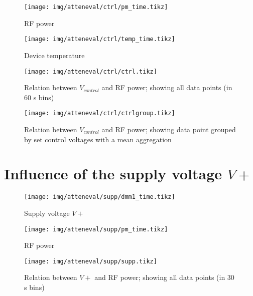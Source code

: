\begin{figure}[H]
	\centering
	\texttt{[image: img/atteneval/ctrl/pm\_time.tikz]}
	\caption{RF power}
	\label{fig:vctrl_spec}
\end{figure}

\begin{figure}[H]
	\centering
	\texttt{[image: img/atteneval/ctrl/temp\_time.tikz]}
	\caption{Device temperature}
	\label{fig:vctrl_spec}
\end{figure}

\begin{figure}[H]
	\centering
	\texttt{[image: img/atteneval/ctrl/ctrl.tikz]}
	\caption{Relation between $V_{control}$ and RF power; showing all data points (in 60 s bins)}
	\label{fig:vctrl_spec}
\end{figure}

\begin{figure}[H]
	\centering
	\texttt{[image: img/atteneval/ctrl/ctrlgroup.tikz]}
	\caption{Relation between $V_{control}$ and RF power; showing data point grouped by set control voltages with a mean aggregation}
	\label{fig:vctrl_spec}
\end{figure}



\newpage
\section{Influence of the supply voltage $V+$}
\begin{figure}[H]
	\centering
	\texttt{[image: img/atteneval/supp/dmm1\_time.tikz]}
	\caption{Supply voltage $V+$}
	\label{fig:vctrl_spec}
\end{figure}

\begin{figure}[H]
	\centering
	\texttt{[image: img/atteneval/supp/pm\_time.tikz]}
	\caption{RF power}
	\label{fig:vctrl_spec}
\end{figure}

\begin{figure}[H]
	\centering
	\texttt{[image: img/atteneval/supp/supp.tikz]}
	\caption{Relation between $V+$ and RF power; showing all data points (in 30 s bins)}
	\label{fig:vctrl_spec}
\end{figure}





